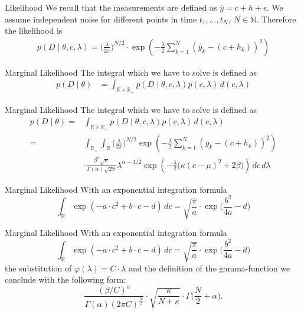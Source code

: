 \documentclass{beamer}
\newcommand{\R}{\mathbb{R}}
\begin{document}
  	\begin{frame}{Likelihood}
  		We recall that the measurements are defined as $\overline{y} = c + h +
  		\epsilon$. We assume independent noise for different points in time $t_1, 
  		\ldots, t_N, \ N \in \mathbb{N}$. Therefore the likelihood is
  		\begin{align*}
  			 p(D \mid \theta, c, \lambda) = \biggl(\frac{\lambda}{2\pi}\biggr) 
  			 ^{N/2} \cdot \exp\left( - \frac{\lambda}{2} \sum_{k = 1}^N 
  			 (\overline{y}_k - (c + h_k))^2 \right)
  		\end{align*}
  	\end{frame}
  	
	\begin{frame}{Marginal Likelihood}
  		The integral which we have to solve is defined as
  		\begin{align}
    		p(D \mid \theta) &= \int_{\R \times \R_+} p(D \mid \theta,c,\lambda) 				p(c, \lambda) \, d(c, \lambda)
		\end{align}
  	\end{frame}  	
  	
  	\begin{frame}{Marginal Likelihood}
  		The integral which we have to solve is defined as
  		\begin{align}
    		p(D \mid \theta) =& \int_{\R \times \R_+} p(D \mid \theta,c,\lambda) 				p(c, \lambda) \, d(c, \lambda) \\
    		=& \int_{\R_+} \int_\R \biggl(\frac{\lambda}{2\pi}\biggr)^{N/2} \exp				\left( - \frac{\lambda}{2} \sum_{k = 1}^N (\overline{y}_k - (c +
    		h_k))^2 \right) \\
    		&\cdot \frac{\beta^\alpha \sqrt{\kappa}}{\Gamma(\alpha)\sqrt{2\pi}} 				\lambda^{\alpha-1/2} \exp\left(- \frac{\lambda}{2} \bigl(\kappa (c - 
    		\mu)^2 + 2\beta\bigr) \right) \, dc \, d\lambda
		\end{align}
  	\end{frame}
  	
  	\begin{frame}{Marginal Likelihood}
  		With an exponential integration formula
  		\[
  			\int_\R \exp(-a \cdot c^2 + b \cdot c - d) \, dc = \sqrt{\frac{\pi}					{a}} \cdot \exp \biggl( \frac{b^2}{4a} - d \biggr)
  		\]
  	\end{frame}  	
  	
  	\begin{frame}{Marginal Likelihood}
  		With an exponential integration formula
  		\[
  			\int_\R \exp(-a \cdot c^2 + b \cdot c - d) \, dc = \sqrt{\frac{\pi}					{a}} \cdot \exp \biggl( \frac{b^2}{4a} - d \biggr)
  		\]
  		the substitution of $\varphi (\lambda) = C \cdot \lambda$ and the 
  		definition of the gamma-function we conclude with the following form:
  		\[
  			\frac{(\beta / C)^\alpha}{\Gamma(\alpha) (2\pi C)^{\frac{N}{2}}} \cdot 			\sqrt{\frac{\kappa}{N + \kappa}} \cdot \Gamma \biggl(\frac{N}{2} + 					\alpha \biggr).
  		\]
   	\end{frame}
   	
\end{document}
